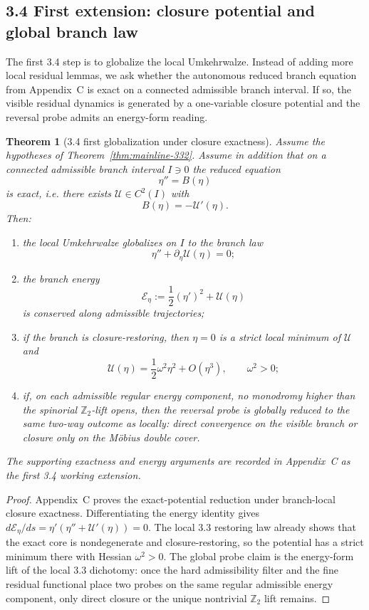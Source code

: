 \documentclass[12pt,a4paper]{article}
\newtheorem{theorem}{Theorem}[section]
\begin{document}
\subsection*{3.4 First extension: closure potential and global branch law}
The first 3.4 step is to globalize the local Umkehrwalze. Instead of adding more local residual lemmas, we ask whether the autonomous reduced branch equation from Appendix~C is exact on a connected admissible branch interval. If so, the visible residual dynamics is generated by a one-variable closure potential and the reversal probe admits an energy-form reading.

\begin{theorem}[3.4 first globalization under closure exactness]
\label{thm:mainline-340}
Assume the hypotheses of Theorem~\ref{thm:mainline-332}. Assume in addition that on a connected admissible branch interval $I\ni 0$ the reduced equation
\[
 \eta'' = B(\eta)
\]
is exact, i.e. there exists $\mathcal U\in C^2(I)$ with
\[
 B(\eta) = -\mathcal U'(\eta).
\]
Then:
\begin{enumerate}[label=(\roman*)]
 \item the local Umkehrwalze globalizes on $I$ to the branch law
 \[
 \eta''+\partial_\eta\mathcal U(\eta)=0;
 \]
 \item the branch energy
 \[
 \mathcal E_\eta := \frac12(\eta')^2 + \mathcal U(\eta)
 \]
 is conserved along admissible trajectories;
 \item if the branch is closure-restoring, then $\eta=0$ is a strict local minimum of $\mathcal U$ and
 \[
 \mathcal U(\eta) = \frac12 \omega^2 \eta^2 + O(\eta^3),
 \qquad \omega^2>0;
 \]
 \item if, on each admissible regular energy component, no monodromy higher than the spinorial $\mathbb Z_2$-lift opens, then the reversal probe is globally reduced to the same two-way outcome as locally: direct convergence on the visible branch or closure only on the M\"obius double cover.
\end{enumerate}
The supporting exactness and energy arguments are recorded in Appendix~C as the first 3.4 working extension.
\end{theorem}

\begin{proof}
Appendix~C proves the exact-potential reduction under branch-local closure exactness. Differentiating the energy identity gives $d\mathcal E_\eta/ds = \eta'(\eta''+\mathcal U'(\eta))=0$. The local 3.3 restoring law already shows that the exact core is nondegenerate and closure-restoring, so the potential has a strict minimum there with Hessian $\omega^2>0$. The global probe claim is the energy-form lift of the local 3.3 dichotomy: once the hard admissibility filter and the fine residual functional place two probes on the same regular admissible energy component, only direct closure or the unique nontrivial $\mathbb Z_2$ lift remains.
\end{proof}
\end{document}
